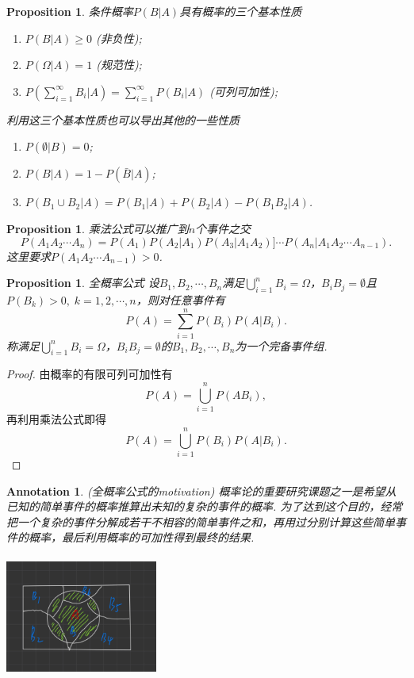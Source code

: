 \documentclass{article}
\newtheorem{proposition}[theorem]{Proposition}
\newtheorem{annotation}[theorem]{Annotation}
\begin{document}
\begin{proposition}
\rm 条件概率$P(B|A)$具有概率的三个基本性质
\begin{enumerate}
	\item $P(B|A) \geq 0$ (非负性);
	\item $P(\Omega|A) = 1$ (规范性);
	\item $P(\sum\limits_{i=1}^{\infty} B_i | A) = \sum\limits_{i=1}^{\infty}P(B_i | A)$ (可列可加性); 
\end{enumerate}

利用这三个基本性质也可以导出其他的一些性质
\begin{enumerate}
	\item $P(\emptyset | B) = 0$;
	\item $P(B|A) = 1 - P(\bar{B} | A)$;
	\item $P(B_1 \cup B_2 | A) = P(B_1 | A) + P(B_2 | A) - P(B_1B_2 |A)$. 
\end{enumerate}
\end{proposition}

\begin{proposition}
\rm 乘法公式可以推广到$n$个事件之交
$$
P(A_1A_2\cdots A_n) = P(A_1)P(A_2|A_1)P(A_3|A_1A_2)]\cdots P(A_n|A_1A_2\cdots A_{n-1}).
$$
这里要求$P(A_1A_2\cdots A_{n-1}) > 0$. 
\end{proposition}

\begin{proposition}
\rm {\color{red}全概率公式} 设$B_1,B_2,\cdots,B_n$满足$\bigcup\limits_{i=1}^n B_i = \Omega$，$B_iB_j = \emptyset$且$P(B_k) > 0,\; k=1,2,\cdots,n$，则对任意事件有
$$
P(A) = \sum\limits_{i=1}^n P(B_i)P(A|B_i).
$$
称满足$\bigcup\limits_{i=1}^n B_i = \Omega$，$B_iB_j = \emptyset$的$B_1,B_2,\cdots,B_n$为一个{\color{red}完备事件组}.
\end{proposition}

\begin{proof}
由概率的有限可列可加性有
$$
P(A) = \bigcup\limits_{i=1}^n P(AB_i),
$$
再利用乘法公式即得
$$
P(A) = \bigcup\limits_{i=1}^n P(B_i)P(A|B_i).
$$
\end{proof}

\begin{annotation}
\rm {\color{red}(全概率公式的motivation)} 概率论的重要研究课题之一是希望从已知的简单事件的概率推算出未知的复杂的事件的概率. 为了达到这个目的，经常把一个复杂的事件分解成若干不相容的简单事件之和，再用过分别计算这些简单事件的概率，最后利用概率的可加性得到最终的结果.

\begin{center}
\includegraphics[width=5cm, height=4cm]{images/total_probability.jpg}
\end{center}
\end{annotation}
\end{document}
